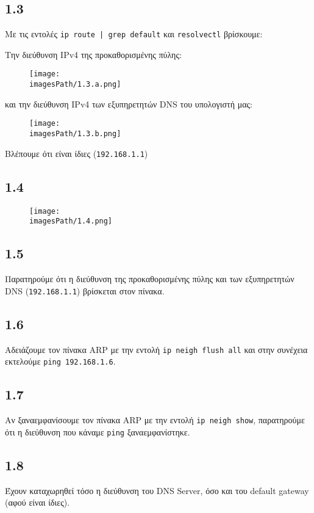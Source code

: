 		\subsection*{1.3}
			Με τις εντολές \verb+ip route | grep default+ και \verb|resolvectl| βρίσκουμε: 
			
			Την διεύθυνση IPv4 της προκαθορισμένης πύλης:
			
			\begin{figure}[H]
				\texttt{[image: \\imagesPath/1.3.a.png]}
			\end{figure}
			
			και την διεύθυνση IPv4 των εξυπηρετητών DNS του υπολογιστή μας:
			
			\begin{figure}[H]
				\texttt{[image: \\imagesPath/1.3.b.png]}
			\end{figure}
		
			Βλέπουμε ότι είναι ίδιες (\verb|192.168.1.1|)
			
		\subsection*{1.4}
			
			\begin{figure}[H]
				\texttt{[image: \\imagesPath/1.4.png]}
			\end{figure}
			
		\subsection*{1.5}
			Παρατηρούμε ότι η διεύθυνση της προκαθορισμένης πύλης και των εξυπηρετητών DNS (\verb|192.168.1.1|) βρίσκεται στον πίνακα.
			
		\subsection*{1.6}
			Αδειάζουμε τον πίνακα ARP με την εντολή \verb|ip neigh flush all| και στην συνέχεια εκτελούμε \verb|ping 192.168.1.6|.
		
		\subsection*{1.7}
			Αν ξαναεμφανίσουμε τον πίνακα ARP με την εντολή \verb|ip neigh show|, παρατηρούμε ότι η διεύθυνση που κάναμε \verb|ping| ξαναεμφανίστηκε.	
		
		\subsection*{1.8} 
			Έχουν καταχωρηθεί τόσο η διεύθυνση του DNS Server, όσο και του default gateway (αφού είναι ίδιες).
		
